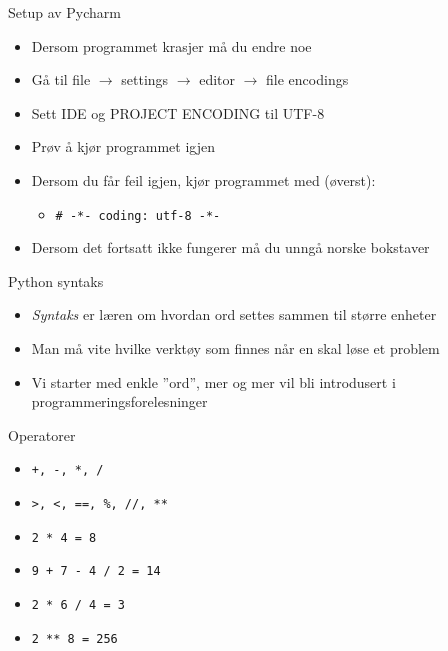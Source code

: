 \documentclass[screen, aspectratio=169]{beamer}
\begin{document}
\begin{frame}[fragile]{Setup av Pycharm}
	\begin{itemize}
		\item Dersom programmet krasjer må du endre noe
		\item Gå til file $\rightarrow$ settings $\rightarrow$ editor $\rightarrow$ file encodings
		\item Sett IDE og PROJECT ENCODING til UTF-8
		\item Prøv å kjør programmet igjen
		\item Dersom du får feil igjen, kjør programmet med (øverst):
		\begin{itemize}
			\item \lstinline|# -*- coding: utf-8 -*-|
		\end{itemize}
		\item Dersom det fortsatt ikke fungerer må du unngå norske bokstaver
	\end{itemize}
\end{frame}

\begin{frame}{Python syntaks}
	\begin{itemize}
		\item \emph{Syntaks} er læren om hvordan ord settes sammen til større enheter
		\item Man må vite hvilke verktøy som finnes når en skal løse et problem
		\item Vi starter med enkle ''ord'', mer og mer vil bli introdusert i programmeringsforelesninger
	\end{itemize}
\end{frame}


\begin{frame}[fragile]{Operatorer}
	\begin{itemize}
		\item \lstinline|+, -, *, /|
		\item \lstinline|>, <, ==, %, //, **|
	\end{itemize}
	\begin{itemize}
		\item \lstinline|2 * 4 = 8|
		\item \lstinline|9 + 7 - 4 / 2 = 14|
		\item \lstinline|2 * 6 / 4 = 3|
		\item \lstinline|2 ** 8 = 256|
	\end{itemize}
\end{frame}
\end{document}
